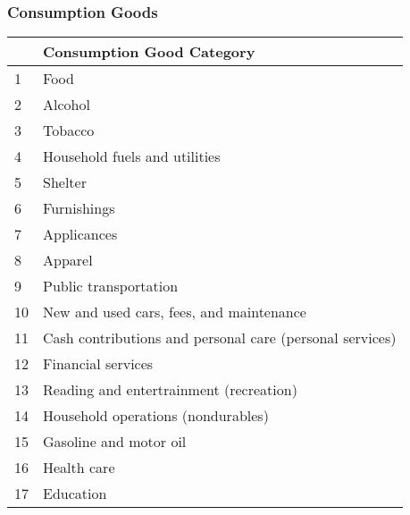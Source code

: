 \documentclass{beamer}
\begin{document}
   \begin{frame}
    \frametitle{Consumption Goods}
\begin{table}[htbp]
  \centering
  \footnotesize
    \begin{tabular}{ll}
    \hline
    \hline
          & Consumption Good Category \\
    \hline
    1     & Food  \\
    2     & Alcohol \\
    3     & Tobacco \\
    4     & Household fuels and utilities \\
    5     & Shelter \\
    6     & Furnishings \\
    7     & Applicances \\
    8     & Apparel \\
    9     & Public transportation \\
    10    & New and used cars, fees, and maintenance \\
    11    & Cash contributions and personal care (personal services) \\
    12    & Financial services \\
    13    & Reading and entertrainment (recreation) \\
    14    & Household operations (nondurables) \\
    15    & Gasoline and motor oil \\
    16    & Health care \\
    17    & Education \\
    \hline
    \hline
    \end{tabular}%
  \label{tab:addlabel}%
\end{table}%
  \end{frame}
\end{document}
